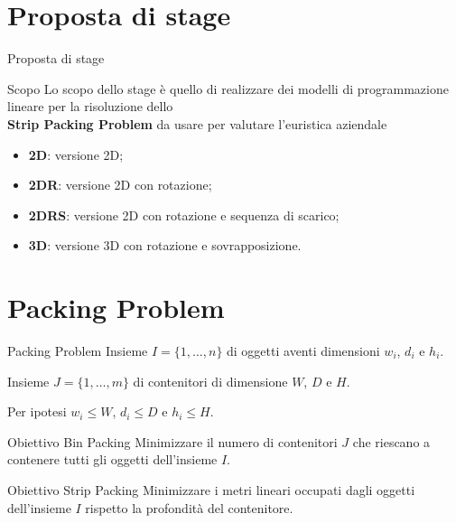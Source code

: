 \documentclass{beamer}
\begin{document}
\section{Proposta di stage}

\begin{frame}{Proposta di stage}
	\begin{alertblock}{Scopo}
		Lo scopo dello stage \`e  quello di realizzare dei modelli di programmazione lineare per la risoluzione dello \\ \textbf{Strip Packing Problem} da usare per valutare l'euristica aziendale
	\end{alertblock}
	\begin{itemize}
		\item \textbf{2D}: versione 2D;
		\item \textbf{2DR}: versione 2D con rotazione;
		\item \textbf{2DRS}: versione 2D con rotazione e sequenza di scarico;
		\item \textbf{3D}: versione 3D con rotazione e sovrapposizione.
	\end{itemize}
\end{frame}

\section{Packing Problem}
\begin{frame}{Packing Problem}
	Insieme $I = \{1,\dots,n\}$ di oggetti aventi dimensioni $w_{i}$, $d_{i}$ e $h_{i}$.	
												
	Insieme $J = \{1,\dots,m\}$ di contenitori di dimensione $W$, $D$ e $H$.
										
	Per ipotesi $w_{i} \leq W$, $d_{i} \leq D$ e $h_{i} \leq H$.
	\vspace{.5em}
	\begin{minipage}[c]{0.45\textwidth}
		\begin{alertblock}{Obiettivo Bin Packing}
			Minimizzare il numero di contenitori $J$ che riescano a contenere tutti gli oggetti dell'insieme $I$.
		\end{alertblock}	
	\end{minipage}
	\hfill
	\begin{minipage}[c]{0.45\textwidth}
		\begin{alertblock}{Obiettivo Strip Packing}
			Minimizzare i metri lineari occupati dagli oggetti dell'insieme $I$ rispetto la profondit\`a del contenitore.
		\end{alertblock}	
	\end{minipage}
\end{frame}
\end{document}
